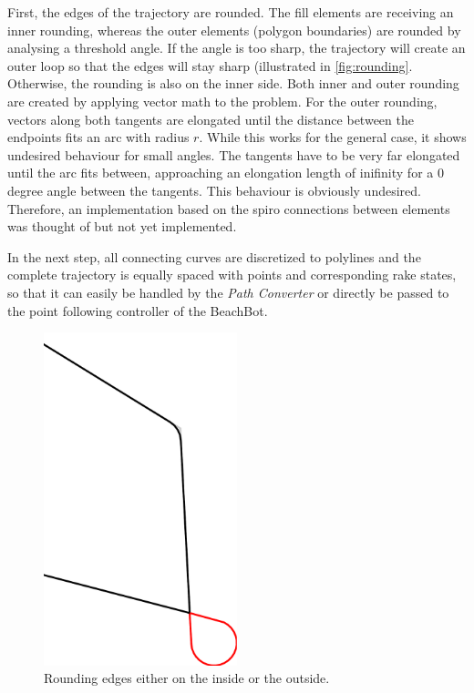 First, the edges of the trajectory are rounded. The fill elements are receiving an inner rounding, whereas the outer elements (polygon boundaries) are rounded by analysing a threshold angle. If the angle is too sharp, the trajectory will create an outer loop so that the edges will stay sharp (illustrated in \autoref{fig:rounding}. Otherwise, the rounding is also on the inner side. Both inner and outer rounding are created by applying vector math to the problem. For the outer rounding, vectors along both tangents are elongated until the distance between the endpoints fits an arc with radius $r$. While this works for the general case, it shows undesired behaviour for small angles. The tangents have to be very far elongated until the arc fits between, approaching an elongation length of inifinity for a 0 degree angle between the tangents. This behaviour is obviously undesired. Therefore, an implementation based on the spiro connections between elements was thought of but not yet implemented. 

In the next step, all connecting curves are discretized to polylines and the complete trajectory is equally spaced with points and corresponding rake states, so that it can easily be handled by the \textit{Path Converter} or directly be passed to the point following controller of the BeachBot.

\begin{figure}
\centering
\includegraphics[width=0.5\textwidth]{images/implementation/rounding_edges.pdf}
\caption{Rounding edges either on the inside or the outside.}
\end{figure}

